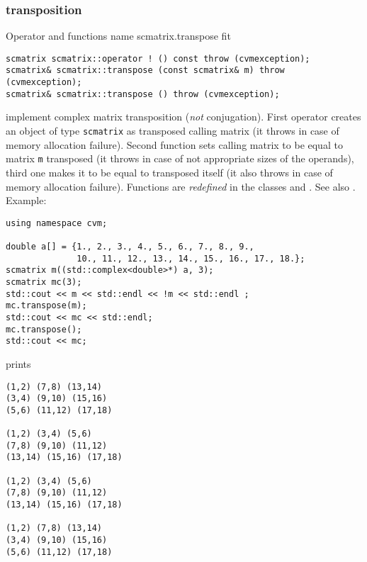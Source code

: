 \subsubsection{transposition}
Operator and functions%
\pdfdest name {scmatrix.transpose} fit
\begin{verbatim}
scmatrix scmatrix::operator ! () const throw (cvmexception);
scmatrix& scmatrix::transpose (const scmatrix& m) throw (cvmexception);
scmatrix& scmatrix::transpose () throw (cvmexception);
\end{verbatim}
implement complex matrix transposition (\emph{not} conjugation).
First operator creates an object of type \verb"scmatrix" as
 transposed calling matrix
(it throws  
in case of memory allocation failure). 
Second function sets  calling matrix to be equal to  matrix
\verb"m" transposed
(it throws  
in case of not appropriate sizes of the operands), 
third one makes it to be equal to
transposed itself (it also throws  
in case of memory allocation failure). 
Functions are \emph{redefined} in the classes
and .
See also .
Example:
\begin{Verbatim}
using namespace cvm;

double a[] = {1., 2., 3., 4., 5., 6., 7., 8., 9.,
              10., 11., 12., 13., 14., 15., 16., 17., 18.};
scmatrix m((std::complex<double>*) a, 3);
scmatrix mc(3);
std::cout << m << std::endl << !m << std::endl ;
mc.transpose(m);
std::cout << mc << std::endl;
mc.transpose();
std::cout << mc;
\end{Verbatim}
prints
\begin{Verbatim}
(1,2) (7,8) (13,14)
(3,4) (9,10) (15,16)
(5,6) (11,12) (17,18)

(1,2) (3,4) (5,6)
(7,8) (9,10) (11,12)
(13,14) (15,16) (17,18)

(1,2) (3,4) (5,6)
(7,8) (9,10) (11,12)
(13,14) (15,16) (17,18)

(1,2) (7,8) (13,14)
(3,4) (9,10) (15,16)
(5,6) (11,12) (17,18)
\end{Verbatim}
\newpage







